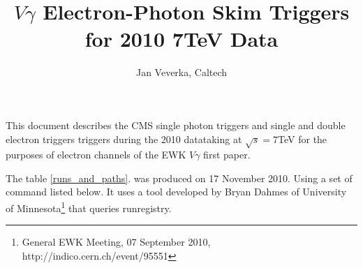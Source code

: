\documentclass[a4paper,10pt]{article}
\title{$V\gamma$ Electron-Photon Skim Triggers for 2010 7TeV Data}
\author{Jan Veverka, Caltech}
\begin{document}
\maketitle
This document describes the CMS single photon triggers and single and double electron triggers triggers 
during the 2010 datataking at $\sqrt{s} = 7$TeV for the purposes of electron channels 
of the EWK $V\gamma$ first paper.

The table \ref{runs_and_paths}. was produced on 17 November 2010. Using a set of command listed below.
It uses a tool developed by Bryan Dahmes of University of Minnesota\footnote{General EWK Meeting, 07 
September 2010, http://indico.cern.ch/event/95551} that queries runregistry.

\begin{center}



\end{center}
\end{document}
